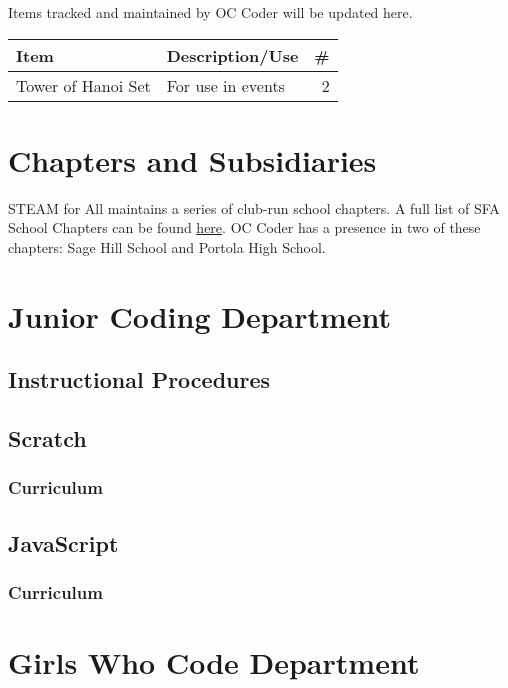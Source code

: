 \documentclass[twoside,11pt,letterpaper,abstracton]{scrartcl}
\begin{document}
Items tracked and maintained by OC Coder will be updated here.

\begin{tabular}{l l r}
    Item   &   Description/Use   &   \#   \\
    \hline
    Tower of Hanoi Set & For use in events & 2  \\
\end{tabular}

\newpage

\section{Chapters and Subsidiaries} \label{schoolchapters}

STEAM for All maintains a series of club-run school chapters. A full list of SFA School Chapters can be found \href{}{here}. OC Coder has a presence in two of these chapters: Sage Hill School and Portola High School.

\newpage

\section{Junior Coding Department} \label{jcc}

\subsection{Instructional Procedures}

\subsection{Scratch} \label{jcc-scratch}

\subsubsection{Curriculum}

\subsection{JavaScript} \label{jcc-js}

\subsubsection{Curriculum}

\newpage

\section{Girls Who Code Department} \label{gwc}
\end{document}
